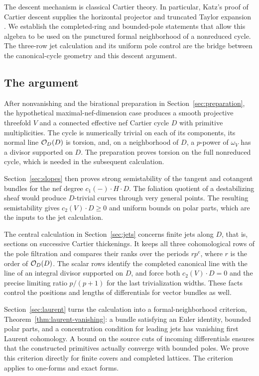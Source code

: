 The descent mechanism is classical Cartier theory.  In particular,
Katz's proof of Cartier descent supplies the horizontal projector and
truncated Taylor expansion \cite[Theorem~5.1]{katz1970}.
We establish the completed-ring and bounded-pole statements that allow
this algebra to be used on the punctured formal neighborhood of a
nonreduced cycle.  The three-row jet calculation and its uniform pole
control are the bridge between the canonical-cycle geometry and this
descent argument.

\subsection{The argument}

After nonvanishing and the birational preparation in
Section~\ref{sec:preparation}, the hypothetical
maximal-nef-dimension case produces a smooth projective threefold $V$
and a connected effective nef Cartier cycle $D$ with primitive
multiplicities.  The cycle is numerically trivial on each of its
components, its normal line $\mathcal O_D(D)$ is torsion, and, on a neighborhood
of $D$, a $p$-power of $\omega_V$ has a divisor supported on $D$.
The preparation proves
torsion on the full nonreduced cycle, which is needed in the subsequent
calculation.

Section~\ref{sec:slopes} then proves strong semistability of the tangent
and cotangent bundles for the nef degree $c_1(-)\cdot H\cdot D$.
The foliation quotient of a destabilizing sheaf would produce
$D$-trivial curves through very general points.  The resulting
semistability gives $c_2(V)\cdot D\geq0$ and uniform bounds on polar
parts, which are the inputs to the jet calculation.

The central calculation in Section~\ref{sec:jets} concerns finite jets
along $D$, that is, sections on successive Cartier thickenings.  It keeps all
three cohomological rows of the pole filtration and compares their
ranks over the periods $rp^e$, where $r$ is the order of
$\mathcal O_D(D)$.  The scalar rows identify the completed canonical line with
the line of an integral divisor supported on $D$, and force both
$c_2(V)\cdot D=0$ and the
precise limiting ratio $p/(p+1)$ for the last trivialization widths.
These facts control the positions and lengths of differentials for
vector bundles as well.

Section~\ref{sec:laurent} turns the calculation into a
formal-neighborhood criterion,
Theorem~\ref{thm:laurent-vanishing}: a bundle satisfying an Euler
identity, bounded polar parts, and a concentration condition for
leading jets has vanishing first Laurent cohomology.  A bound on the
source cuts of incoming differentials ensures that the constructed
primitives actually converge with bounded poles.  We prove this
criterion directly for finite covers and completed lattices.
The criterion applies to one-forms and exact forms.

